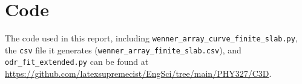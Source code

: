 \documentclass[12pt]{IEEEtran}
\begin{document}
\appendix

\section{Code} \label{code}

The code used in this report, including \verb|wenner_array_curve_finite_slab.py|, the \verb|csv| file it generates (\verb|wenner_array_finite_slab.csv|), and \verb|odr_fit_extended.py| can be found at \url{https://github.com/latexsupremecist/EngSci/tree/main/PHY327/C3D}.

{}

\end{document}
